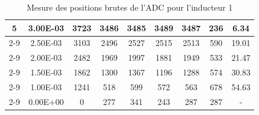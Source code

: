 \begin{table}[H]
{\begin{tabular}{|c|c|c|c|c|c|c|c|c|}
            \multirow{6}{*}{5} & 3.00E-03         & 3723      & 3486                                                       & 3485                                                      & 3489                                                      & 3487    & 236    & 6.34                                                               \\ \cline{2-9}
                               & 2.50E-03         & 3103      & 2496                                                       & 2527                                                      & 2515                                                      & 2513    & 590    & 19.01                                                              \\ \cline{2-9}
                               & 2.00E-03         & 2482      & 1969                                                       & 1997                                                      & 1881                                                      & 1949    & 533    & 21.47                                                              \\ \cline{2-9}
                               & 1.50E-03         & 1862      & 1300                                                       & 1367                                                      & 1196                                                      & 1288    & 574    & 30.83                                                              \\ \cline{2-9}
                               & 1.00E-03         & 1241      & 518                                                        & 599                                                       & 572                                                       & 563     & 678    & 54.63                                                              \\ \cline{2-9}
                               & 0.00E+00         & 0         & 277                                                        & 341                                                       & 243                                                       & 287     & 287    & -                                                                  \\ \hline
        \end{tabular}%
    }
    \caption{Mesure des positions brutes de l'ADC pour l'inducteur 1}
    \label{tab:adc_brut_inducteur1}
\end{table}

